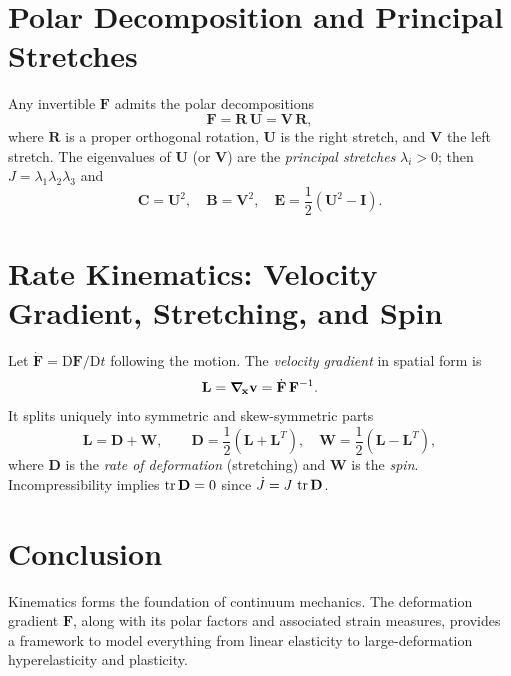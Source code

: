 \documentclass[12pt,a4paper]{article}
\begin{document}
\section{Polar Decomposition and Principal Stretches}
Any invertible $\mathbf{F}$ admits the polar decompositions
\begin{equation}
\mathbf{F} = \mathbf{R}\,\mathbf{U} = \mathbf{V}\,\mathbf{R},
\end{equation}
where $\mathbf{R}$ is a proper orthogonal rotation, $\mathbf{U}$ is the right stretch, and $\mathbf{V}$ the left stretch. The eigenvalues of $\mathbf{U}$ (or $\mathbf{V}$) are the \emph{principal stretches} $\lambda_i>0$; then $J=\lambda_1\lambda_2\lambda_3$ and
\begin{equation}
\mathbf{C} = \mathbf{U}^2,\quad \mathbf{B}=\mathbf{V}^2,\quad \mathbf{E}=\dfrac{1}{2}(\mathbf{U}^2-\mathbf{I}).
\end{equation}

\section{Rate Kinematics: Velocity Gradient, Stretching, and Spin}
Let $\dot{\mathbf{F}}=\mathrm{D}\mathbf{F}/\mathrm{D}t$ following the motion. The \emph{velocity gradient} in spatial form is
\begin{equation}
\mathbf{L} = \grad_{\!\mathbf{x}}\mathbf{v} = \dot{\mathbf{F}}\,\mathbf{F}^{-1}.
\end{equation}
It splits uniquely into symmetric and skew-symmetric parts
\begin{equation}
\mathbf{L} = \mathbf{D} + \mathbf{W},\qquad \mathbf{D}=\dfrac{1}{2}\left(\mathbf{L}+\mathbf{L}^T\right),\quad \mathbf{W}=\dfrac{1}{2}\left(\mathbf{L}-\mathbf{L}^T\right),
\end{equation}
where $\mathbf{D}$ is the \emph{rate of deformation} (stretching) and $\mathbf{W}$ is the \emph{spin}. Incompressibility implies $\tr\mathbf{D}=0$ since $\dot{J}=J\,\tr\mathbf{D}$.

\section{Conclusion}
Kinematics forms the foundation of continuum mechanics. The deformation gradient $\mathbf{F}$, along with its polar factors and associated strain measures, provides a framework to model everything from linear elasticity to large-deformation hyperelasticity and plasticity. 
\end{document}
